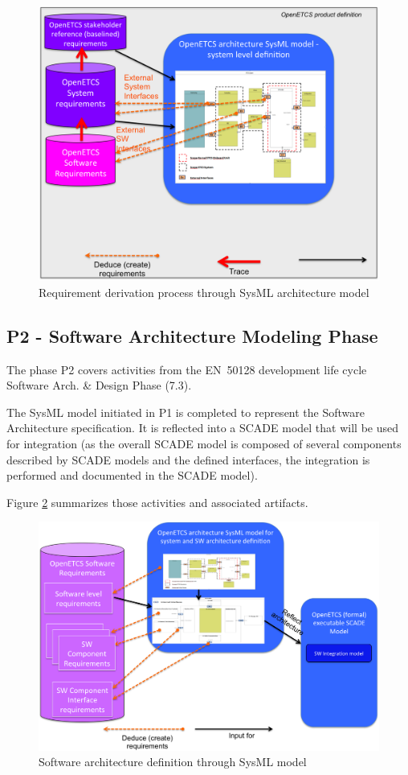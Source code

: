 \documentclass[11pt]{template/openetcs_report}
\begin{document}
\begin{figure}[htbp]
\centering
\includegraphics[width=.9\linewidth]
{./images/P1RequirementDerivationWithSysMLModel.png}
\caption{\label{fig:P1RequirementDerivationWithSysMLModel}Requirement derivation process through SysML architecture model}
\end{figure}


\subsection{P2 - Software Architecture Modeling Phase}
The phase P2 covers activities from the EN~50128 development life cycle Software Arch. \& Design Phase (7.3).

The SysML model initiated in P1 is completed to represent the Software Architecture specification. It is reflected into a SCADE model that will be used for integration (as the overall SCADE model is composed of several components described by SCADE models and the defined interfaces, the integration is performed and documented in the SCADE model).

Figure \ref{fig:P2SoftwareArchitectureWithSysMLModel} summarizes those activities and associated artifacts.

\begin{figure}[htbp]
\centering
\includegraphics[width=.9\linewidth]
{./images/P2SoftwareArchitectureWithSysMLModel.png}
\caption{\label{fig:P2SoftwareArchitectureWithSysMLModel}Software architecture definition through SysML model}
\end{figure}
\end{document}
